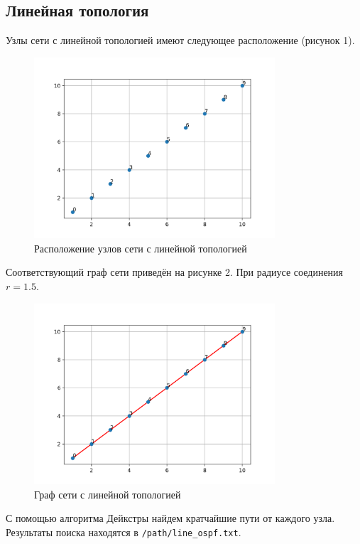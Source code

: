 \documentclass[a4paper,14pt]{extarticle}
\begin{document}
\subsection{Линейная топология}
Узлы сети с линейной топологией имеют следующее расположение (рисунок 1).

\begin{figure}[htbp]
    \centering
    \includegraphics[width=0.8\textwidth]{img/line_points.png}
    \caption{Расположение узлов сети с линейной топологией}
    \label{fig:hamiltonianGraph}
\end{figure}

Соответствующий граф сети приведён на рисунке 2. При радиусе соединения $r=1.5$.

\begin{figure}[htbp]
    \centering
    \includegraphics[width=0.8\textwidth]{img/line_graph.png}
    \caption{Граф сети с линейной топологией}
    \label{fig:hamiltonianGraph}
\end{figure}


С помощью алгоритма Дейкстры найдем кратчайшие пути от каждого узла. Результаты поиска находятся в \texttt{/path/line\_ospf.txt}.
\end{document}
